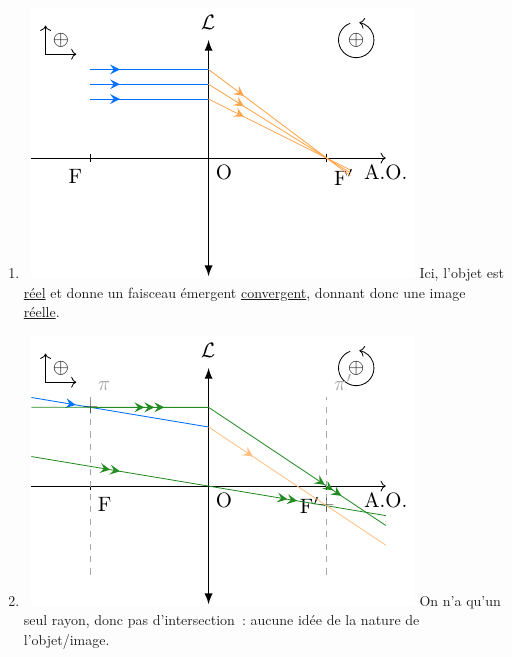 \documentclass[../../main/main.tex]{subfiles}
\begin{document}
{\begin{multicols}{2}
\begin{enumerate}
			      \columnbreak
			\item ~\smallbreak\includegraphics[width=\linewidth]{convHF}
			      Ici, l'objet est \underline{réel} et donne un faisceau émergent
			      \underline{convergent}, donnant donc une image \underline{réelle}.
			\item ~\smallbreak\includegraphics[width=\linewidth]{convQQE}
			      On n'a qu'un seul rayon, donc pas d'intersection~: aucune idée de la
			      nature de l'objet/image.
		\end{enumerate}
	\end{multicols}
}
\end{document}
